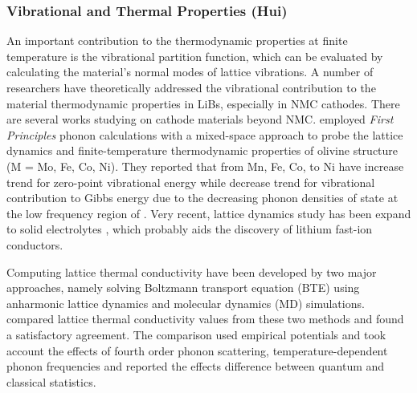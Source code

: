 \documentclass[../main.tex]{subfiles}
\begin{document}
\subsubsection{Vibrational and Thermal Properties (Hui)}
An important contribution to the thermodynamic properties at finite temperature is the vibrational partition function, which can be evaluated by calculating the material’s normal modes of lattice vibrations. A number of researchers have theoretically addressed the vibrational contribution to the material thermodynamic properties in LiBs, especially in NMC cathodes. \cite{du2016insight,yang2019highly,yang2020chemical} There are several works studying on cathode materials beyond NMC. \citeauthor{shang2012lattice} employed \textit{First Principles} phonon calculations with a mixed-space approach to probe the lattice dynamics and finite-temperature thermodynamic properties of olivine structure  (M = Mo, Fe, Co, Ni).\cite{shang2012lattice} They reported that  from Mn, Fe, Co, to Ni have increase trend for zero-point vibrational energy while decrease trend for vibrational contribution to Gibbs energy due to the decreasing phonon densities of state at the low frequency region of .
Very recent, lattice dynamics study has been expand to solid electrolytes , which probably aids the discovery of lithium fast-ion conductors. \cite{sagotra2019influence} 

Computing lattice thermal conductivity have been developed by two major approaches, namely  solving Boltzmann transport equation (BTE) using anharmonic lattice dynamics and molecular dynamics (MD) simulations. \citeauthor{puligheddu2019computational} compared lattice thermal conductivity values from these two methods and found a satisfactory agreement.\cite{puligheddu2019computational} The comparison used empirical potentials and took account the effects of fourth order phonon scattering, temperature-dependent phonon frequencies and reported the effects difference between quantum and classical statistics.
\end{document}
